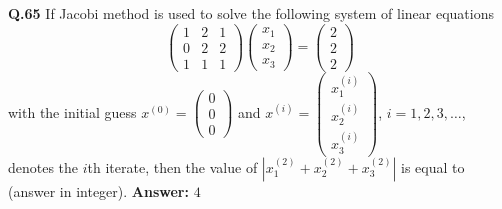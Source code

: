 \documentclass[11pt,a4paper]{article}
\newcommand{\ans}[1]{\textbf{Answer:} #1\par\medskip}
\begin{document}
\textbf{Q.65} If Jacobi method is used to solve the following system of linear equations
\[
  \begin{pmatrix} 1 & 2 & 1 \\ 0 & 2 & 2 \\ 1 & 1 & 1 \end{pmatrix} \begin{pmatrix} x_1 \\ x_2 \\ x_3 \end{pmatrix} = \begin{pmatrix} 2 \\ 2 \\ 2 \end{pmatrix}
\]
with the initial guess $x^{(0)} = \begin{pmatrix} 0 \\ 0 \\ 0 \end{pmatrix}$ and $x^{(i)} = \begin{pmatrix} x_1^{(i)} \\ x_2^{(i)} \\ x_3^{(i)} \end{pmatrix}$, $i = 1, 2, 3, \ldots$, denotes the $i$th iterate, then the value of $|x_1^{(2)} + x_2^{(2)} + x_3^{(2)}|$ is equal to \underline{\hspace{2cm}} (answer in integer).
\ans{$4$}
\end{document}

